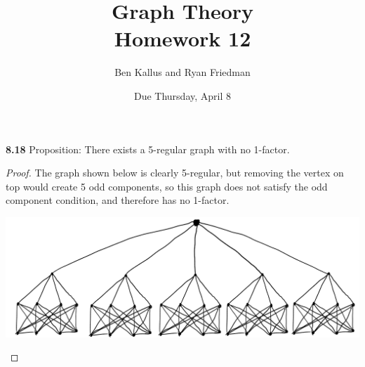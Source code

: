 \documentclass[12pt]{article}
\title{Graph Theory \\ Homework 12}
\author{Ben Kallus and Ryan Friedman}
\date{Due Thursday, April 8}
\begin{document}
\maketitle

\medskip\noindent\textbf{8.18} Proposition: There exists a 5-regular graph with no 1-factor.
\begin{proof}
    The graph shown below is clearly 5-regular, but removing the vertex on top would create 5 odd components, so this graph does not satisfy the odd component condition, and therefore has no 1-factor.
    \begin{center}\includegraphics[scale=.4]{pic1.png}\end{center}
\end{proof}
\end{document}
